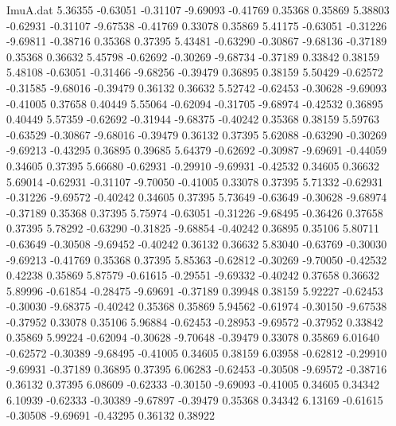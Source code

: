 \begin{filecontents}{ImuA.dat}
   5.36355   -0.63051   -0.31107   -9.69093   -0.41769    0.35368    0.35869
   5.38803   -0.62931   -0.31107   -9.67538   -0.41769    0.33078    0.35869
   5.41175   -0.63051   -0.31226   -9.69811   -0.38716    0.35368    0.37395
   5.43481   -0.63290   -0.30867   -9.68136   -0.37189    0.35368    0.36632
   5.45798   -0.62692   -0.30269   -9.68734   -0.37189    0.33842    0.38159
   5.48108   -0.63051   -0.31466   -9.68256   -0.39479    0.36895    0.38159
   5.50429   -0.62572   -0.31585   -9.68016   -0.39479    0.36132    0.36632
   5.52742   -0.62453   -0.30628   -9.69093   -0.41005    0.37658    0.40449
   5.55064   -0.62094   -0.31705   -9.68974   -0.42532    0.36895    0.40449
   5.57359   -0.62692   -0.31944   -9.68375   -0.40242    0.35368    0.38159
   5.59763   -0.63529   -0.30867   -9.68016   -0.39479    0.36132    0.37395
   5.62088   -0.63290   -0.30269   -9.69213   -0.43295    0.36895    0.39685
   5.64379   -0.62692   -0.30987   -9.69691   -0.44059    0.34605    0.37395
   5.66680   -0.62931   -0.29910   -9.69931   -0.42532    0.34605    0.36632
   5.69014   -0.62931   -0.31107   -9.70050   -0.41005    0.33078    0.37395
   5.71332   -0.62931   -0.31226   -9.69572   -0.40242    0.34605    0.37395
   5.73649   -0.63649   -0.30628   -9.68974   -0.37189    0.35368    0.37395
   5.75974   -0.63051   -0.31226   -9.68495   -0.36426    0.37658    0.37395
   5.78292   -0.63290   -0.31825   -9.68854   -0.40242    0.36895    0.35106
   5.80711   -0.63649   -0.30508   -9.69452   -0.40242    0.36132    0.36632
   5.83040   -0.63769   -0.30030   -9.69213   -0.41769    0.35368    0.37395
   5.85363   -0.62812   -0.30269   -9.70050   -0.42532    0.42238    0.35869
   5.87579   -0.61615   -0.29551   -9.69332   -0.40242    0.37658    0.36632
   5.89996   -0.61854   -0.28475   -9.69691   -0.37189    0.39948    0.38159
   5.92227   -0.62453   -0.30030   -9.68375   -0.40242    0.35368    0.35869
   5.94562   -0.61974   -0.30150   -9.67538   -0.37952    0.33078    0.35106
   5.96884   -0.62453   -0.28953   -9.69572   -0.37952    0.33842    0.35869
   5.99224   -0.62094   -0.30628   -9.70648   -0.39479    0.33078    0.35869
   6.01640   -0.62572   -0.30389   -9.68495   -0.41005    0.34605    0.38159
   6.03958   -0.62812   -0.29910   -9.69931   -0.37189    0.36895    0.37395
   6.06283   -0.62453   -0.30508   -9.69572   -0.38716    0.36132    0.37395
   6.08609   -0.62333   -0.30150   -9.69093   -0.41005    0.34605    0.34342
   6.10939   -0.62333   -0.30389   -9.67897   -0.39479    0.35368    0.34342
   6.13169   -0.61615   -0.30508   -9.69691   -0.43295    0.36132    0.38922

\end{filecontents}

